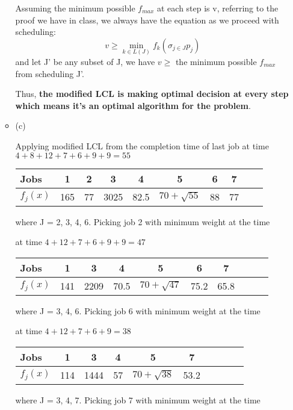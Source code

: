 \documentclass[12pt]{article}
\begin{document}
\begin{enumerate}
\begin{itemize}
Assuming the minimum possible $f_{max}$ at each step is v, referring to the proof we have in class, we always have the equation as we proceed with scheduling:
\begin{equation}
v \geq \min_{k \in L(J)}{f_{k}(\sigma_{j \in J}p_{j})}
\end{equation}
and let J' be any subset of J, we have $v \geq$ the minimum possible $f_{max}$ from scheduling J'.

Thus, \textbf{the modified LCL is making optimal decision at every step which means it's an optimal algorithm for the problem}.

\item{(c)}

Applying modified LCL from the completion time of last job at time $4 + 8 + 12 + 7 + 6 + 9 + 9 = 55$
\begin{center}
\begin{tabular}{l*{8}{c}r}
Jobs          & 1 & 2 & 3 & 4 & 5 & 6 & 7                                                            \\
\hline
$f_{j}(x)$    & 165 & 77 & 3025 & 82.5 & $70 + \sqrt{55}$ & 88 & 77               \\
\end{tabular}
\end{center}
where J = 2, 3, 4, 6. Picking job 2 with minimum weight at the time

at time $4 + 12 + 7 + 6 + 9 + 9 = 47$
\begin{center}
\begin{tabular}{l*{8}{c}r}
Jobs          & 1 & 3 & 4 & 5 & 6 & 7                                         \\
\hline
$f_{j}(x)$    & 141 & 2209 & 70.5 & $70 + \sqrt{47}$ & 75.2 & 65.8            \\
\end{tabular}
\end{center}
where J = 3, 4, 6. Picking job 6 with minimum weight at the time

at time $4 + 12 + 7 + 6 + 9 = 38$
\begin{center}
\begin{tabular}{l*{8}{c}r}
Jobs          & 1 & 3 & 4 & 5 & 7                                       \\
\hline
$f_{j}(x)$    & 114 & 1444 & 57 & $70 + \sqrt{38}$ & 53.2               \\
\end{tabular}
\end{center}
where J = 3, 4, 7. Picking job 7 with minimum weight at the time


\end{itemize}
\end{enumerate}
\end{document}
